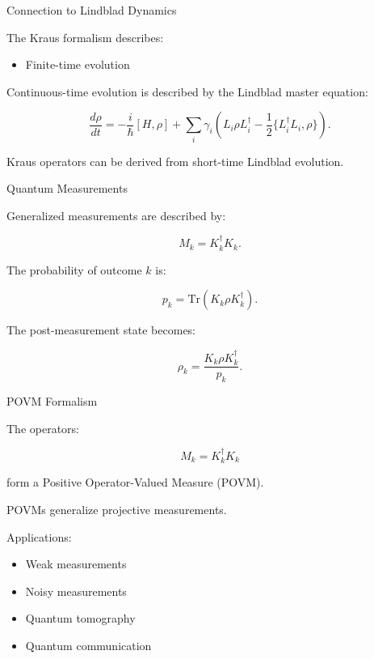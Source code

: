 \documentclass{beamer}
\begin{document}
\begin{frame}{Connection to Lindblad Dynamics}

The Kraus formalism describes:
\begin{itemize}
    \item Finite-time evolution
\end{itemize}

\vspace{0.3cm}

Continuous-time evolution is described by the
Lindblad master equation:

\[
\frac{d\rho}{dt}
=
-\frac{i}{\hbar}[H,\rho]
+
\sum_i
\gamma_i
\left(
L_i \rho L_i^\dagger
-
\frac12
\{L_i^\dagger L_i,\rho\}
\right).
\]

\vspace{0.3cm}

Kraus operators can be derived from short-time
Lindblad evolution.

\end{frame}

\begin{frame}{Quantum Measurements}

Generalized measurements are described by:

\[
M_k = K_k^\dagger K_k.
\]

\vspace{0.4cm}

The probability of outcome \(k\) is:

\[
p_k
=
\mathrm{Tr}
(K_k \rho K_k^\dagger).
\]

\vspace{0.4cm}

The post-measurement state becomes:

\[
\rho_k
=
\frac{
K_k \rho K_k^\dagger
}{
p_k
}.
\]

\end{frame}

\begin{frame}{POVM Formalism}

The operators:

\[
M_k
=
K_k^\dagger K_k
\]

form a Positive Operator-Valued Measure (POVM).

\vspace{0.4cm}

POVMs generalize projective measurements.

\vspace{0.4cm}

Applications:
\begin{itemize}
    \item Weak measurements
    \item Noisy measurements
    \item Quantum tomography
    \item Quantum communication
\end{itemize}

\end{frame}
\end{document}
